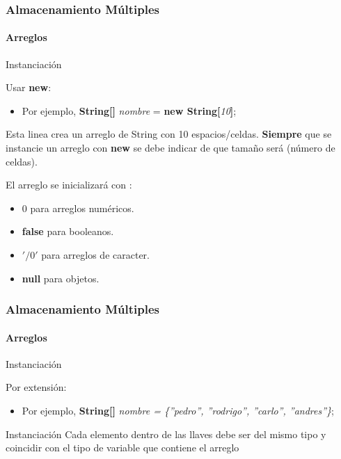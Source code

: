 \documentclass{beamer}
\begin{document}
        \begin{frame}
			\frametitle{Almacenamiento M\'ultiples}
			\framesubtitle{Arreglos}

			\begin{block}{Instanciaci\'on}
			    {\scriptsize
				    Usar \textbf{new}:
				    \begin{itemize}
                        \item[] Por ejemplo, \textbf{String[]} \emph{nombre} = \textbf{new String[}\emph{10}\textbf{]};
                    \end{itemize}
                    Esta linea crea un arreglo de String con 10 espacios/celdas. \textbf{Siempre} que se instancie un arreglo con \textbf{new} se debe indicar de que tama\~no ser\'a (n\'umero de celdas).
			    }
			\end{block}
			\begin{block}{}
			    {\scriptsize
			    El arreglo se inicializar\'a con : 
                \begin{itemize}
                    \item $0$ para arreglos num\'ericos.
                    \item \textbf{false} para booleanos.
                    \item $'/0'$  para arreglos de caracter.
                    \item \textbf{null} para objetos.
                 \end{itemize}
			    }
			\end{block}
		\end{frame}

        \begin{frame}
			\frametitle{Almacenamiento M\'ultiples}
			\framesubtitle{Arreglos}

			\begin{block}{Instanciaci\'on}
			    {\scriptsize
				    Por extensi\'on:
				    \begin{itemize}
                        \item[] Por ejemplo, \textbf{String[]} \emph{nombre = \{''pedro'', ''rodrigo'', ''carlo'', ''andres''\}};
                    \end{itemize}
			    }
			\end{block}
			\begin{block}{Instanciaci\'on}
			    {\scriptsize
				    Cada elemento dentro de las llaves debe ser del mismo tipo y coincidir con el tipo de variable que contiene el arreglo
			    }
			\end{block}
		\end{frame}
   
\end{document}

